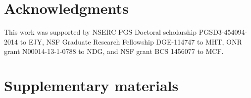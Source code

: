 \documentclass[12pt]{article}
\newcommand{\ejy}[1]{\textcolor{Red}{[ejy: #1]}}
\begin{document}












\section*{Acknowledgments}
This work was supported by NSERC PGS Doctoral scholarship PGSD3-454094-2014 to EJY, NSF Graduate Research Fellowship DGE-114747 to MHT, ONR grant N00014-13-1-0788 to NDG, and NSF grant BCS 1456077 to MCF.


\section*{Supplementary materials}

\end{document}
